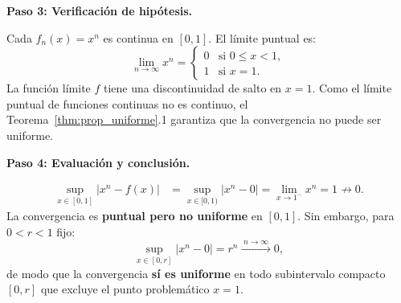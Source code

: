 \begin{example}
\begin{myproof}
\textbf{Paso 3: Verificación de hipótesis.}

Cada $f_n(x) = x^n$ es continua en $[0,1]$. El límite puntual es:
\[
    \lim_{n \to \infty} x^n =
    \begin{cases}
        0 & \text{si } 0 \leq x < 1, \\
        1 & \text{si } x = 1.
    \end{cases}
\]
La función límite $f$ tiene una discontinuidad de salto en $x=1$. Como
el límite puntual de funciones continuas no es continuo, el
Teorema~\ref{thm:prop_uniforme}.1 garantiza que la convergencia no puede
ser uniforme.

\textbf{Paso 4: Evaluación y conclusión.}

\begin{align*}
    \sup_{x\in[0,1]} |x^n - f(x)|
        &= \sup_{x\in[0,1)} |x^n - 0|
         = \lim_{x \to 1^-} x^n = 1 \not\to 0.
\end{align*}
La convergencia es \textbf{puntual pero no uniforme} en $[0,1]$.
Sin embargo, para $0 < r < 1$ fijo:
\[
    \boxed{\sup_{x\in[0,r]} |x^n - 0| = r^n
        \xrightarrow{\;n\to\infty\;} 0,}
\]
de modo que la convergencia \textbf{sí es uniforme} en todo
subintervalo compacto $[0,r]$ que excluye el punto problemático $x=1$.
\end{myproof}
\end{example}

